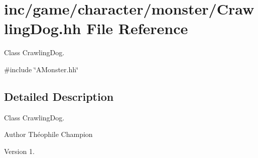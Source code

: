 \hypertarget{CrawlingDog_8hh}{}\section{inc/game/character/monster/\+Crawling\+Dog.hh File Reference}
\label{CrawlingDog_8hh}


Class Crawling\+Dog.  


{\ttfamily \#include \char`\"{}A\+Monster.\+hh\char`\"{}}\newline


\subsection{Detailed Description}
Class Crawling\+Dog. 

\begin{DoxyAuthor}{Author}
Théophile Champion 
\end{DoxyAuthor}
\begin{DoxyVersion}{Version}
1. 
\end{DoxyVersion}

